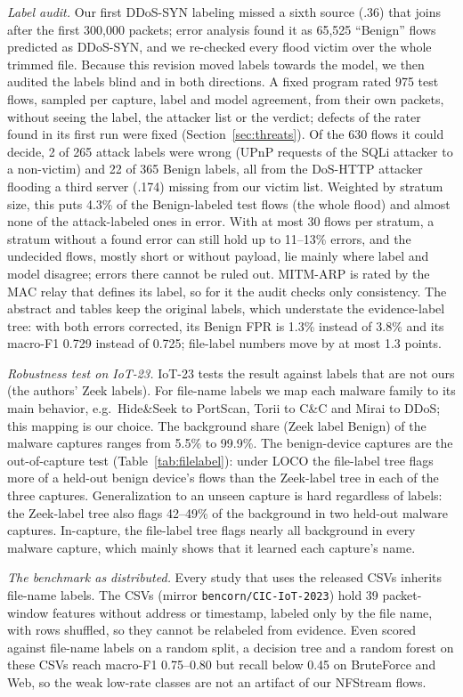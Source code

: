 \emph{Label audit.} Our first DDoS-SYN labeling missed a sixth source (.36) that joins after the first 300,000 packets; error analysis found it as 65,525 ``Benign'' flows predicted as DDoS-SYN, and we re-checked every flood victim over the whole trimmed file. Because this revision moved labels towards the model, we then audited the labels blind and in both directions. A fixed program rated 975 test flows, sampled per capture, label and model agreement, from their own packets, without seeing the label, the attacker list or the verdict; defects of the rater found in its first run were fixed (Section~\ref{sec:threats}). Of the 630 flows it could decide, 2 of 265 attack labels were wrong (UPnP requests of the SQLi attacker to a non-victim) and 22 of 365 Benign labels, all from the DoS-HTTP attacker flooding a third server (.174) missing from our victim list. Weighted by stratum size, this puts 4.3\% of the Benign-labeled test flows (the whole flood) and almost none of the attack-labeled ones in error. With at most 30 flows per stratum, a stratum without a found error can still hold up to 11--13\% errors, and the undecided flows, mostly short or without payload, lie mainly where label and model disagree; errors there cannot be ruled out. MITM-ARP is rated by the MAC relay that defines its label, so for it the audit checks only consistency. The abstract and tables keep the original labels, which understate the evidence-label tree: with both errors corrected, its Benign FPR is 1.3\% instead of 3.8\% and its macro-F1 0.729 instead of 0.725; file-label numbers move by at most 1.3 points.

\emph{Robustness test on IoT-23.} IoT-23 tests the result against labels that are not ours (the authors' Zeek labels). For file-name labels we map each malware family to its main behavior, e.g.\ Hide\&Seek to PortScan, Torii to C\&C and Mirai to DDoS; this mapping is our choice. The background share (Zeek label Benign) of the malware captures ranges from 5.5\% to 99.9\%. The benign-device captures are the out-of-capture test (Table~\ref{tab:filelabel}): under LOCO the file-label tree flags more of a held-out benign device's flows than the Zeek-label tree in each of the three captures. Generalization to an unseen capture is hard regardless of labels: the Zeek-label tree also flags 42--49\% of the background in two held-out malware captures. In-capture, the file-label tree flags nearly all background in every malware capture, which mainly shows that it learned each capture's name.

\emph{The benchmark as distributed.} Every study that uses the released CSVs inherits file-name labels. The CSVs (mirror \texttt{bencorn/CIC-IoT-2023}) hold 39 packet-window features without address or timestamp, labeled only by the file name, with rows shuffled, so they cannot be relabeled from evidence. Even scored against file-name labels on a random split, a decision tree and a random forest on these CSVs reach macro-F1 0.75--0.80 but recall below 0.45 on BruteForce and Web, so the weak low-rate classes are not an artifact of our NFStream flows.
